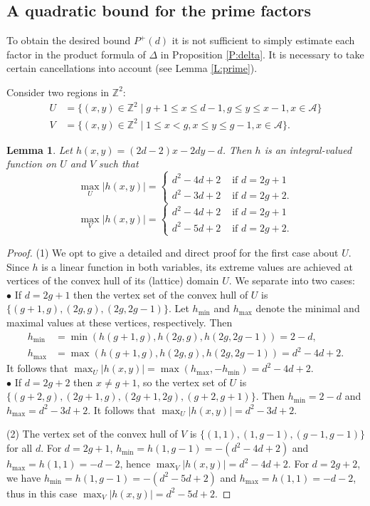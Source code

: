 \documentclass{amsart}
\theoremstyle{plain}
\newtheorem{lemma}[theorem]{Lemma}
\theoremstyle{remark}
\theoremstyle{remark}
\newcommand{\cA}{\mathcal{A}}
\newcommand{\0}{\mathbf{0}}
\newcommand{\1}{\mathbf{1}}
\newcommand{\Z}{\mathbb{Z}}
\begin{document}
\subsection{A quadratic bound for the prime factors}


To obtain the desired bound $P^+(d)$ it is not sufficient to 
simply estimate each factor in the product formula of $\Delta$ in Proposition 
\ref{P:delta}. 
It is necessary to take certain cancellations into 
account (see Lemma \ref{L:prime}). 

Consider two regions in $\Z^2$:
\begin{align*}
U &=\{(x,y)\in\Z^2 \mid  g+1\le x\le d-1, g\le y\le x-1, x\in \cA\}\\
V &=\{(x,y)\in\Z^2 \mid  1\le x < g, x\le y\le g-1, x\in \cA\}.
\end{align*}

\begin{lemma}\label{L:h}
Let $h(x,y)=(2d-2)x-2dy-d$.
Then $h$ is an integral-valued function on $U$ and $V$
such that
$$
\max_{U}|h(x,y)|=
\begin{cases}
d^2-4d+2 & \mbox{ if $d=2g+1$}\\
d^2-3d+2 &  \mbox{ if $d=2g+2$}. 
\end{cases}
$$
$$
\max_{V}|h(x,y)|=
\begin{cases}
d^2-4d+2 &\mbox{ if $d=2g+1$}\\
d^2-5d+2 &\mbox{ if $d=2g+2$}.
\end{cases}
$$
\end{lemma}

\begin{proof}
(1) We opt to give a detailed and direct proof for 
the first case about $U$.
Since $h$ is a linear function in both variables, its extreme values are achieved
at vertices of the convex hull of its (lattice) domain $U$. 
We separate into two cases:\\
\noindent $\bullet$ 
If $d=2g+1$ then the vertex set of the convex hull of 
$U$ is $\{(g+1,g),(2g,g), (2g,2g-1)\}$.
Let 
$h_{\min}$ and $h_{\max}$ denote the minimal and maximal values at 
these vertices, respectively. Then
\begin{align*}
h_{\min}&=\min(h(g+1,g),h(2g,g),h(2g,2g-1))=2-d,\\
h_{\max}&=\max(h(g+1,g),h(2g,g),h(2g,2g-1))= d^2-4d+2.
\end{align*}
It follows that $\max_U |h(x,y)|=\max(h_{\max},-h_{\min})=d^2-4d+2.$\\
\noindent $\bullet$ If $d=2g+2$ then $x\ne g+1$, so the vertex set of $U$ 
is $\{(g+2,g),(2g+1,g),(2g+1,2g), (g+2,g+1)\}$. Then
$h_{\min}=2-d$ and $h_{\max}=d^2-3d+2$. It follows that $\max_U|h(x,y)|=d^2-3d+2$.

\vspace{2mm}

(2) The vertex set of the convex hull of $V$ is 
$\{(1,1),(1,g-1), (g-1,g-1)\}$ for all $d$.
For $d=2g+1$, $h_{\min}=h(1,g-1)=-(d^2-4d+2)$ 
and $h_{\max}=h(1,1)=-d-2$, hence $\max_V|h(x,y)|=d^2-4d+2$.
For $d=2g+2$, we have
$h_{\min}=h(1,g-1)=-(d^2-5d+2)$ and 
$h_{\max}=h(1,1)=-d-2$, thus in this case 
$\max_V|h(x,y)|=d^2-5d+2$. 
\end{proof}
\end{document}
